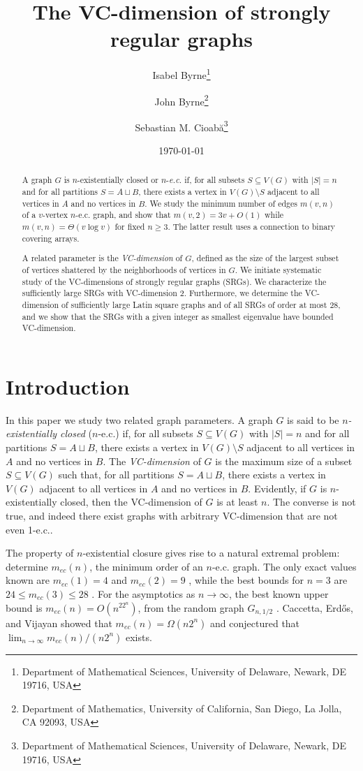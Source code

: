 \documentclass{article}
\title{The VC-dimension of strongly regular graphs}
\author{Isabel Byrne\footnote{Department of Mathematical Sciences, University of Delaware, Newark, DE 19716, USA} \and John Byrne\footnote{Department of Mathematics, University of California, San Diego, La Jolla, CA 92093, USA} \and Sebastian M. Cioab\u a\footnote{Department of Mathematical Sciences, University of Delaware, Newark, DE 19716, USA}}
\date{\today}
\newcommand\sm{\setminus}
\theoremstyle{definition}
\begin{document}
\maketitle

\begin{abstract}
    A graph $G$ is $n$-existentially closed or $n$-\textit{e.c.} if, for all subsets $S\subseteq V(G)$ with $|S|=n$ and for all partitions $S=A\sqcup B$, there exists a vertex in $V(G)\sm S$ adjacent to all vertices in $A$ and no vertices in $B$. We study the minimum number of edges $m(v,n)$ of a $v$-vertex $n$-e.c. graph, and show that $m(v,2)=3v+O(1)$ while $m(v,n)=\Theta(v\log v)$ for fixed $n\ge 3$. The latter result uses a connection to binary covering arrays.

    A related parameter is the \textit{VC-dimension} of $G$, defined as the size of the largest subset of vertices shattered by the neighborhoods of vertices in $G$. We initiate systematic study of the VC-dimensions of strongly regular graphs (SRGs). We characterize the sufficiently large SRGs with VC-dimension 2. Furthermore, we determine the VC-dimension of sufficiently large Latin square graphs and of all SRGs of order at most 28, and we show that the SRGs with a given integer as smallest eigenvalue have bounded VC-dimension.
\end{abstract}

\section{Introduction}

In this paper we study two related graph parameters. A graph $G$ is said to be \textit{$n$-existentially closed} ($n$-e.c.) if, for all subsets $S\subseteq V(G)$ with $|S|=n$ and for all partitions $S=A\sqcup B$, there exists a vertex in $V(G)\sm S$ adjacent to all vertices in $A$ and no vertices in $B$. The \textit{VC-dimension} of $G$ is the maximum size of a subset $S\subseteq V(G)$ such that, for all partitions $S=A\sqcup B$, there exists a vertex in $V(G)$ adjacent to all vertices in $A$ and no vertices in $B$. Evidently, if $G$ is $n$-existentially closed, then the VC-dimension of $G$ is at least $n$. The converse is not true, and indeed there exist graphs with arbitrary VC-dimension that are not even 1-e.c..

The property of $n$-existential closure gives rise to a natural extremal problem: determine $m_{ec}(n)$, the minimum order of an $n$-e.c. graph. The only exact values known are $m_{ec}(1)=4$ and $m_{ec}(2)=9$ \cite{caccetta1985property}, while the best bounds for $n=3$ are $24\le m_{ec}(3)\le 28$ \cite{bonato2001adjacency,gordinowicz2010search}. For the asymptotics as $n\to\infty$, the best known upper bound is $m_{ec}(n)=O(n^22^n)$, from the random graph $G_{n,1/2}$ \cite{erdos1963asymmetric}. Caccetta, Erd\H{o}s, and Vijayan \cite{caccetta1985property} showed that $m_{ec}(n)=\Omega(n2^n)$ and conjectured that $\lim_{n\to\infty}m_{ec}(n)/(n2^n)$ exists.
\end{document}
